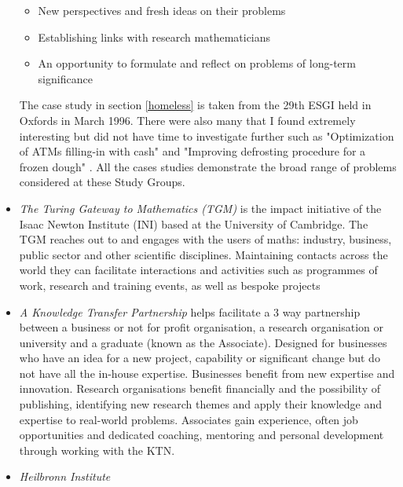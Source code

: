 \documentclass[11pt]{article} %
\begin{document}
\begin{itemize}
\begin{itemize}
			\item New perspectives and fresh ideas on their problems
			\item Establishing links with research mathematicians
			\item An opportunity to formulate and reflect on problems  of long-term significance
		\end{itemize}	
		The case study in section \ref{homeless} is taken from the 29th ESGI held in Oxfords in March 1996. There were also many that I found extremely interesting but did not have time to investigate further such as  "Optimization of ATMs filling-in with cash" \cite{Broda} and "Improving defrosting procedure for a frozen dough" \cite{Luci}. All the cases studies demonstrate the broad range of problems considered at these Study Groups. 
		\item \textit{The Turing Gateway to Mathematics (TGM)} is the impact initiative of the Isaac Newton Institute (INI) based at the University of Cambridge. The TGM reaches out to and engages with the users of maths: industry, business, public sector and other scientific disciplines. Maintaining contacts across the world they can facilitate interactions and activities such as programmes of work, research and training events, as well as bespoke projects
		\item  \textit{A Knowledge Transfer Partnership} helps facilitate a 3 way partnership between a business or not for profit organisation, a research organisation or university and a graduate (known as the Associate). Designed for businesses who have an idea for a new project, capability or significant change but  do not have all the in-house expertise. Businesses benefit from new expertise and innovation. Research organisations benefit financially and  the possibility of publishing, identifying new research themes and apply their knowledge and expertise to real-world problems. Associates gain experience, often job opportunities and dedicated coaching, mentoring and personal development through working with the KTN.
		\item \textit{Heilbronn Institute}
		 
		
	
	\end{itemize}
\end{document}
